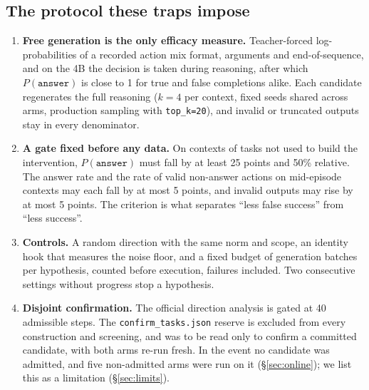 \subsection{The protocol these traps impose}
\label{sec:protocol}
\begin{enumerate}
\item \textbf{Free generation is the only efficacy measure.} Teacher-forced log-probabilities of a recorded action mix format, arguments and end-of-sequence, and on the 4B the decision is taken during reasoning, after which $P(\texttt{answer})$ is close to 1 for true and false completions alike. %
Each candidate regenerates the full reasoning ($k=4$ per context, fixed seeds shared across arms, production sampling with \texttt{top\_k=20}), and invalid or truncated outputs stay in every denominator.
\item \textbf{A gate fixed before any data.} On \fsp{} contexts of tasks not used to build the intervention, $P(\texttt{answer})$ must fall by at least 25 points and 50\% relative. The \fsm{} answer rate and the rate of valid non-answer actions on mid-episode contexts may each fall by at most 5 points, and invalid outputs may rise by at most 5 points. %
The \fsm{} criterion is what separates ``less false success'' from ``less success''.
\item \textbf{Controls.} A random direction with the same norm and scope, an identity hook that measures the noise floor, and a fixed budget of generation batches per hypothesis, counted before execution, failures included. Two consecutive settings without progress stop a hypothesis.
\item \textbf{Disjoint confirmation.} The official direction analysis is gated at 40 admissible \fsp{} steps. The \texttt{confirm\_tasks.json} reserve is excluded from every construction and screening, and was to be read only to confirm a committed candidate, with both arms re-run fresh. In the event no candidate was admitted, and five non-admitted arms were run on it (\S\ref{sec:online}); we list this as a limitation (\S\ref{sec:limits}).
\end{enumerate}
